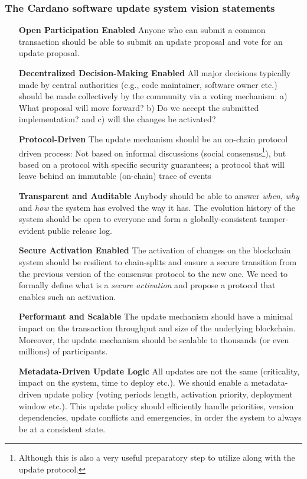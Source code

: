 \subsubsection{The Cardano software update system vision
	statements}\label{sec:vision_statements}
\begin{itemize}
	\item[\textbf{Open Participation Enabled}] Anyone who can submit a common
	transaction should be able to submit an update proposal and vote for an
	update proposal.
	
	\item[\textbf{Decentralized Decision-Making Enabled}]  All major decisions
	typically made by central authorities (e.g., code maintainer, software
	owner etc.)
	should
	be made
	collectively by the community via a voting mechanism: a) What proposal will
	move forward? b) Do we accept the submitted implementation? and c)
	will the changes be activated?
	
	\item[\textbf{Protocol-Driven}] The update mechanism should be an on-chain
	protocol driven process: Not
	based on informal discussions (social consensus\footnote{Although this is
		also a very useful preparatory step to utilize along with the update
		protocol.}), but based on a protocol
	with specific security guarantees; a protocol that will leave behind an
	immutable (on-chain) trace of events
	
	\item[\textbf{Transparent and Auditable}] Anybody should be able to answer
	\emph{when}, \emph{why} and \emph{how} the system has evolved the way it
	has. The evolution history of the system should be open to everyone and
	form a globally-consistent tamper-evident public release log.
	
	\item[\textbf{Secure Activation Enabled}] The activation of changes on the 
	blockchain system should be resilient to chain-splits and ensure a secure 
	transition from the previous version of the consensus protocol to the new 
	one. We need to formally define what is a \emph{secure
		activation} and propose a protocol that enables such an activation.
	
	\item[\textbf{Performant and Scalable}] The update mechanism should have a 
	minimal impact on the transaction throughput and size of the underlying
	blockchain. Moreover, the update mechanism should be scalable to thousands
	(or even
	millions) of participants.
	
	\item[\textbf{Metadata-Driven Update Logic}] All updates are not the same
	(criticality,
	impact on the system, time to deploy etc.). We should enable a
	metadata-driven update policy (voting periods length, activation priority,
	deployment window etc.). This update policy should efficiently handle
	priorities, version dependencies, update conflicts and emergencies, in
	order the system to always be at a consistent state.
	
\end{itemize}



